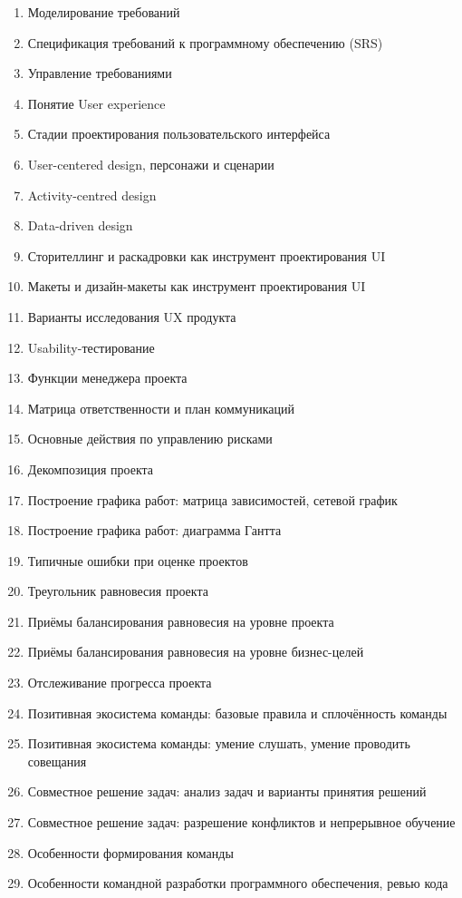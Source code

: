 \documentclass[a5paper]{article}
\begin{document}
\begin{enumerate}
    \item Моделирование требований
    \item Спецификация требований к программному обеспечению (SRS)
    \item Управление требованиями
    \item Понятие User experience
    \item Стадии проектирования пользовательского интерфейса
    \item User-centered design, персонажи и сценарии
    \item Activity-centred design
    \item Data-driven design
    \item Сторителлинг и раскадровки как инструмент проектирования UI
    \item Макеты и дизайн-макеты как инструмент проектирования UI
    \item Варианты исследования UX продукта
    \item Usability-тестирование
    \item Функции менеджера проекта
    \item Матрица ответственности и план коммуникаций
    \item Основные действия по управлению рисками
    \item Декомпозиция проекта
    \item Построение графика работ: матрица зависимостей, сетевой график
    \item Построение графика работ: диаграмма Гантта
    \item Типичные ошибки при оценке проектов
    \item Треугольник равновесия проекта
    \item Приёмы балансирования равновесия на уровне проекта
    \item Приёмы балансирования равновесия на уровне бизнес-целей
    \item Отслеживание прогресса проекта
    \item Позитивная экосистема команды: базовые правила и сплочённость команды
    \item Позитивная экосистема команды: умение слушать, умение проводить совещания
    \item Совместное решение задач: анализ задач и варианты принятия решений
    \item Совместное решение задач: разрешение конфликтов и непрерывное обучение
    \item Особенности формирования команды
    \item Особенности командной разработки программного обеспечения, ревью кода

\end{enumerate}
\end{document}
